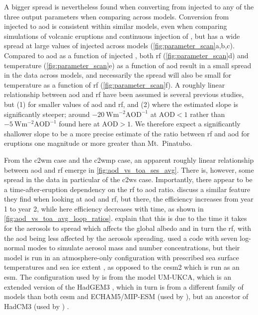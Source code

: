 \documentclass[twocol]{ametsocV6.1}
\newcommand{\iso}[1][i]{{#1}njected \ce{SO2}}
\begin{document}
A bigger spread is nevertheless found when converting from \iso{} to any of the three
output parameters when comparing across models. Conversion from \iso{} to \gls{aod} is
consistent within similar models, even when comparing simulations of volcanic eruptions
\citep{timmreck2010} and continuous injection of  \citep{niemeier2015}, but has
a wide spread at large values of \iso{} across models
(\ref{fig:parameter_scan}a,b,c). Compared to \gls{aod} as a
function of \iso{}, both \gls{rf} (\ref{fig:parameter_scan}d) and temperature
(\ref{fig:parameter_scan}e) as a function of \gls{aod} result in a small spread in the data
across models, and necessarily the spread will also be small for temperature as a
function of \gls{rf} (\ref{fig:parameter_scan}f). A roughly linear relationship between
\gls{aod} and \gls{rf} have been assumed is several previous studies, but (1) for
smaller values of \gls{aod} and \gls{rf}, and (2) where the estimated slope is
significantly steeper; around \(\SI{-20}{\watt\metre^{-2}\mathrm{AOD}^{-1}}\) at
\(\mathrm{AOD}<1\) rather than \(\SI{-5}{\watt\metre^{-2}\mathrm{AOD}^{-1}}\) found here
at \(\mathrm{AOD}>1\). We therefore expect a significantly shallower slope to be a more
precise estimate of the ratio between \gls{rf} and \gls{aod} for eruptions one magnitude
or more greater than Mt.\ Pinatubo.

From the \gls{c2wm} case and the \gls{c2wmp} case, an apparent roughly linear
relationship between \gls{aod} and \gls{rf} emerge in \ref{fig:aod_vs_toa_ses_avg}.
There is, however, some spread in the data in particular of the \gls{c2ws} case.
Importantly, there appear to be a time-after-eruption dependency on the \gls{rf} to
\gls{aod} ratio. \citet{marshall2020} discuss a similar feature they find when looking
at \gls{aod} and \gls{rf}, but there, the efficiency increases from year 1 to year 2,
while here efficiency decreases with time, as shown in
\ref{fig:aod_vs_toa_avg_loop_ratios}. \citet{marshall2020} explain that this is due to
the time it takes for the aerosols to spread which affects the global albedo and in turn
the \gls{rf}, with the \gls{aod} being less affected by the aerosols spreading.
\citet{marshall2019, marshall2020, marshall2021} used a code with seven log-normal modes
to simulate aerosol mass and number concentrations, but their model is run in an
atmosphere-only configuration with prescribed sea surface temperatures and sea ice
extent \citep{marshall2019}, as opposed to the \gls{cesm2} which is run as an \gls{esm}.
The configuration used by \citet{marshall2019} is from the model UM-UKCA, which is an
extended version of the HadGEM3 \citep{dhomse2014}, which in turn is from a different
family of models than both \gls{cesm} and ECHAM5/MIP-ESM (used by
\citet{timmreck2010,niemeier2015}), but an ancestor of HadCM3 (used by
\citet{gregory2016}) \citep{kuma2023}.
\end{document}
